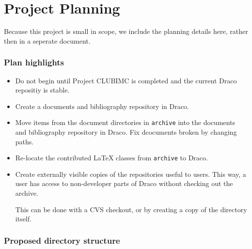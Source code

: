 \documentclass[11pt]{nmemo}
\begin{document}
\section*{Project Planning}

Because this project is small in scope, we include the planning
details here, rather then in a seperate document.

\subsubsection*{Plan highlights}

\begin{itemize}
\item Do not begin until Project CLUBIMC is completed and the current
  Draco repositiy is stable.

\item Create a documents and bibliography repository in Draco.
  
\item Move items from the document directories in {\tt archive} into
  the documents and bibliography repository in Draco. Fix dcocuments
  broken by changing paths.

\item Re-locate the contributed LaTeX classes from {\tt archive} to
  Draco.
  
\item Create externally visible copies of the repositories useful to
  users. This way, a user has access to non-developer parts of Draco
  without checking out the archive.

  This can be done with a CVS checkout, or by creating a copy of the
  directory itself.

\end{itemize}

\subsubsection*{Proposed directory structure}
\end{document}
